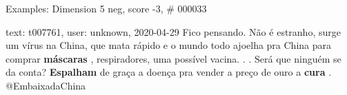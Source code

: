 \begin{frame}{Examples: Dimension 5 neg, score -3, \# 000033}
\footnotesize
\begin{alertblock}{text: t007761, user: unknown, 2020-04-29}
Fico pensando. Não é estranho, surge um vírus na China, que mata rápido e o 
mundo todo ajoelha pra China para comprar \textbf{máscaras} , respiradores, uma 
possível vacina. . . Será que ninguém se da conta? \textbf{Espalham} de graça a 
doença pra vender a preço de ouro a \textbf{cura} . @EmbaixadaChina 
\end{alertblock}
\end{frame}
